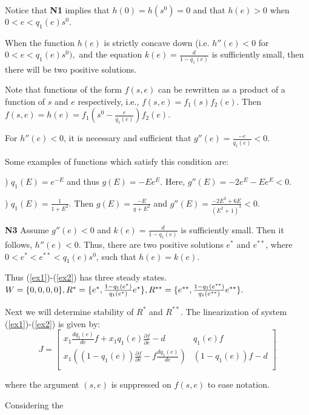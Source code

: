 \documentclass[12pt]{article}
\begin{document}
\noindent Notice that \textbf{N1} implies that $h(0)=h(s^0)=0$ and that $h(e)>0$ when $0<e<q_1(e)s^0.$

\noindent When the function $h(e)$ is strictly concave down (i.e. $h''(e)<0$ for $0<e<q_1(e)s^0),$ and the equation $k(e)=\frac{d}{1-q_1(e)}$ is sufficiently small, then there will be two positive solutions. 

\noindent Note that functions of the form $f(s,e)$ can be rewritten as a product of a function of $s$ and $e$ respectively, i.e., $f(s,e)=f_1(s)f_2(e)$. Then $f(s,e)=h(e)=f_1(s^0-\frac{e}{q_1(e)})f_2(e)$. 

\noindent For $h''(e)<0$, it is necessary and sufficient that $g''(e)=\frac{-e}{q_1(e)}<0$. 

\noindent Some examples of functions which satisfy this condition are: 

) $q_1(E)=e^{-E}$ and thus $g(E)=-Ee^{E}$. Here, $g''(E)=-2e^E-Ee^E<0$. 

) $q_1(E)=\frac{1}{1+E^2}$. Then $g(E)=\frac{-E}{q+E^2}$ and $g''(E)=\frac{-2E^3+6E}{(E^2+1)^3}<0$.

\noindent \textbf{N3} Assume $g''(e)<0$ and $k(e)=\frac{d}{1-q_1(e)}$ is sufficiently small. Then it follows, $h''(e)<0$. Thus, there are two positive solutions $e^*$ and $e^{**}$, where $0<e^*<e^{**}<q_1(e)s^0$, such that $h(e)=k(e)$. 

\noindent Thus (\ref{ex1})-(\ref{ex2}) has three steady states. $W=\{0,0,0,0\}, R^*=\{e^*,\frac{1-q_1(e^*)}{q_1(e^*)}e^*\},\\ R^{**}=\{e^{**},\frac{1-q_1(e^{**})}{q_1(e^{**})}e^{**}\}.$

\noindent Next we will determine stability of $R^*$ and $R^{**}$. The linearization of system (\ref{ex1})-(\ref{ex2}) is given by: 
\[ 
J=
\begin{bmatrix}
 x_1 \frac{d q_1(e)}{de} f + x_1 q_1(e) \frac{\partial f}{\partial e} -d  & q_1(e) f  \\
x_1 ((1-q_1(e))\frac{\partial f}{\partial e} - f\frac{d q_1(e)}{d e}) & (1-q_1(e))f -d \\

\end{bmatrix}
\]

where the argument $(s,e)$ is suppressed on $f(s,e)$ to ease notation. 

\noindent Considering the 
\end{document}
